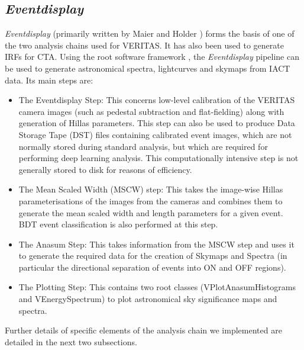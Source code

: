 \subsection{\textit{Eventdisplay}}

\textit{Eventdisplay} (primarily written by Maier and Holder \cite{evdisp}) forms the basis of one of the two analysis chains used for VERITAS. It has also been used to generate IRFs for CTA. Using the root software framework \cite{root}, the \textit{Eventdisplay} pipeline can be used to generate astronomical spectra, lightcurves and skymaps from IACT data. Its main steps are:

\begin{itemize}
\item The Eventdisplay Step: This concerns low-level calibration of the VERITAS camera images (such as pedestal subtraction and flat-fielding) along with generation of Hillas parameters. This step can also be used to produce Data Storage Tape (DST) files containing calibrated event images, which are not normally stored during standard analysis, but which are required for performing deep learning analysis. This computationally intensive step is not generally stored to disk for reasons of efficiency.

\item The Mean Scaled Width (MSCW) step: This takes the image-wise Hillas parameterisations of the images from the cameras and combines them to generate the mean scaled width and length parameters for a given event. BDT event classification is also performed at this step. 

\item The Anasum Step: This takes information from the MSCW step and uses it to generate the required data for the creation of Skymaps and Spectra (in particular the directional separation of events into ON and OFF regions). 

\item The Plotting Step: This contains two root classes (VPlotAnasumHistograms and VEnergySpectrum) to plot astronomical sky significance maps and spectra.

\end{itemize}

Further details of specific elements of the analysis chain we implemented are detailed in the next two subsections.
